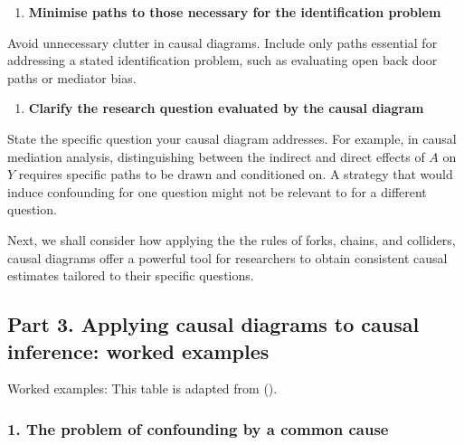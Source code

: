 \documentclass[
  singlecolumn]{article}
\providecommand{\tightlist}{%
  \setlength{\itemsep}{0pt}\setlength{\parskip}{0pt}}\usepackage{longtable,booktabs,array}
\begin{document}
\begin{enumerate}
\def\labelenumi{\arabic{enumi}.}
\setcounter{enumi}{7}
\tightlist
\item
  \textbf{Minimise paths to those necessary for the identification
  problem}
\end{enumerate}

Avoid unnecessary clutter in causal diagrams. Include only paths
essential for addressing a stated identification problem, such as
evaluating open back door paths or mediator bias.

\begin{enumerate}
\def\labelenumi{\arabic{enumi}.}
\setcounter{enumi}{8}
\tightlist
\item
  \textbf{Clarify the research question evaluated by the causal diagram}
\end{enumerate}

State the specific question your causal diagram addresses. For example,
in causal mediation analysis, distinguishing between the indirect and
direct effects of \(A\) on \(Y\) requires specific paths to be drawn and
conditioned on. A strategy that would induce confounding for one
question might not be relevant to for a different question.

Next, we shall consider how applying the the rules of forks, chains, and
colliders, causal diagrams offer a powerful tool for researchers to
obtain consistent causal estimates tailored to their specific questions.

\subsection{Part 3. Applying causal diagrams to causal inference: worked
examples}\label{part-3.-applying-causal-diagrams-to-causal-inference-worked-examples}

\begin{table}

\caption{\label{tbl-04}Worked examples: This table is adapted from
().}

\centering{

\terminologyelconfoundersLONG

}

\end{table}%

\subsubsection{1. The problem of confounding by a common
cause}\label{the-problem-of-confounding-by-a-common-cause}
\end{document}
